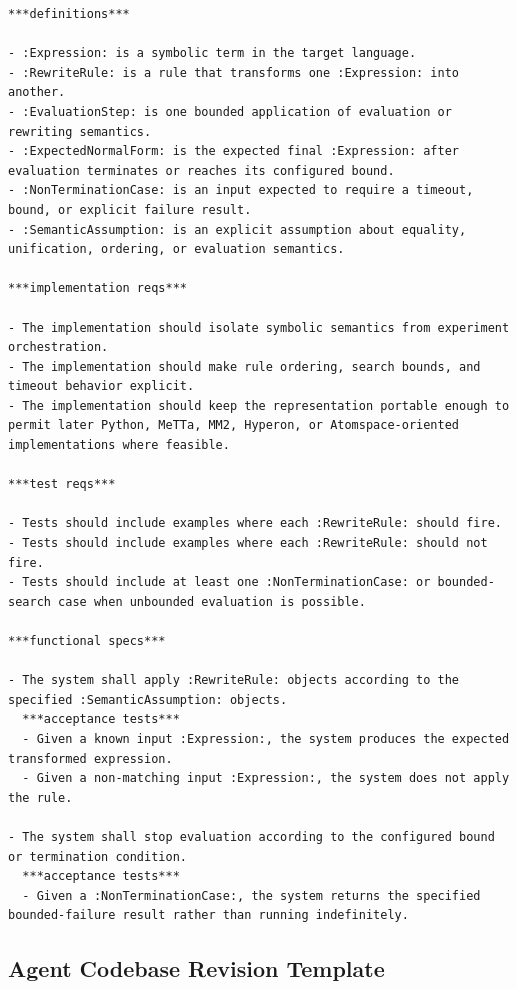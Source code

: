 \documentclass[11pt]{article}
\begin{document}
\begin{lstlisting}
***definitions***

- :Expression: is a symbolic term in the target language.
- :RewriteRule: is a rule that transforms one :Expression: into another.
- :EvaluationStep: is one bounded application of evaluation or rewriting semantics.
- :ExpectedNormalForm: is the expected final :Expression: after evaluation terminates or reaches its configured bound.
- :NonTerminationCase: is an input expected to require a timeout, bound, or explicit failure result.
- :SemanticAssumption: is an explicit assumption about equality, unification, ordering, or evaluation semantics.

***implementation reqs***

- The implementation should isolate symbolic semantics from experiment orchestration.
- The implementation should make rule ordering, search bounds, and timeout behavior explicit.
- The implementation should keep the representation portable enough to permit later Python, MeTTa, MM2, Hyperon, or Atomspace-oriented implementations where feasible.

***test reqs***

- Tests should include examples where each :RewriteRule: should fire.
- Tests should include examples where each :RewriteRule: should not fire.
- Tests should include at least one :NonTerminationCase: or bounded-search case when unbounded evaluation is possible.

***functional specs***

- The system shall apply :RewriteRule: objects according to the specified :SemanticAssumption: objects.
  ***acceptance tests***
  - Given a known input :Expression:, the system produces the expected transformed expression.
  - Given a non-matching input :Expression:, the system does not apply the rule.

- The system shall stop evaluation according to the configured bound or termination condition.
  ***acceptance tests***
  - Given a :NonTerminationCase:, the system returns the specified bounded-failure result rather than running indefinitely.
\end{lstlisting}

\subsection{Agent Codebase Revision Template}
\end{document}
